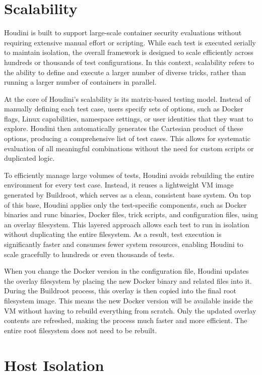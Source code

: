 \begin{doublespace}
\section{Scalability}

Houdini is built to support large-scale container security evaluations without requiring extensive manual effort or scripting. While each test is executed serially to maintain isolation, the overall framework is designed to scale efficiently across hundreds or thousands of test configurations. In this context, scalability refers to the ability to define and execute a larger number of diverse tricks, rather than running a larger number of containers in parallel.

At the core of Houdini's scalability is its matrix-based testing model. Instead of manually defining each test case, users specify sets of options, such as Docker flags, Linux capabilities, namespace settings, or user identities that they want to explore. Houdini then automatically generates the Cartesian product of these options, producing a comprehensive list of test cases. This allows for systematic evaluation of all meaningful combinations without the need for custom scripts or duplicated logic.

To efficiently manage large volumes of tests, Houdini avoids rebuilding the entire environment for every test case. Instead, it reuses a lightweight VM image generated by Buildroot, which serves as a clean, consistent base system. On top of this base, Houdini applies only the test-specific components, such as Docker binaries and runc binaries, Docker files, trick scripts, and configuration files, using an \gls{overlay} filesystem. This layered approach allows each test to run in isolation without duplicating the entire filesystem. As a result, test execution is significantly faster and consumes fewer system resources, enabling Houdini to scale gracefully to hundreds or even thousands of tests. 

When you change the Docker version in the configuration file, Houdini updates the overlay filesystem by placing the new Docker binary and related files into it. During the Buildroot process, this overlay is then copied into the final root filesystem image. This means the new Docker version will be available inside the VM without having to rebuild everything from scratch. Only the updated overlay contents are refreshed, making the process much faster and more efficient. The entire root filesystem does not need to be rebuilt.


\section{Host Isolation}


\end{doublespace}
